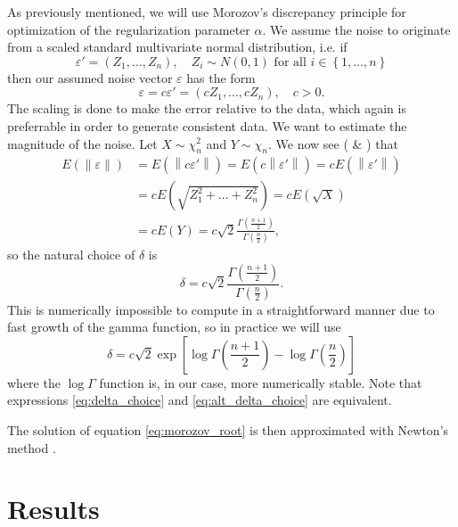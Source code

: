 \documentclass[12pt,a4]{article}
\newcommand{\lnorm}{\left\|}
\newcommand{\rnorm}{\right\|}
\newcommand{\eps}{\ensuremath{\varepsilon}}
\begin{document}
As previously mentioned, we will use Morozov's discrepancy principle for optimization of the regularization parameter $\alpha$. We assume the noise to originate from a scaled standard multivariate normal distribution, i.e. if
\begin{equation}
\eps' = \left(Z_1, \ldots, Z_n \right), \quad Z_i \sim N(0,1) \text{ for all }
i \in \left\{1, \ldots, n\right\}
\end{equation}
then our assumed noise vector $\eps$ has the form
\begin{equation}
\eps = c\eps' = \left(cZ_1, \ldots, cZ_n \right), \quad c > 0.
\end{equation}
The scaling is done to make the error relative to the data, which again is preferrable in order to generate consistent data. We want to estimate the magnitude of the noise. Let $X \sim \chi_n^2$ and $Y \sim \chi_n$. We now see (\cite{chi} \& \cite{handbook}) that
\begin{align*}
E\left(\lnorm \eps \rnorm \right)   &= E\left(\lnorm c\eps' \rnorm \right)   =
E\left(c \lnorm \eps' \rnorm \right) = c E\left(\lnorm \eps' \rnorm \right) \\
&= c E\left(\sqrt{Z_1^2 + \ldots + Z_n^2} \right) = c E\left(\sqrt{X} \right) \\
&= c E\left( Y \right) = 
c \sqrt{2}\frac{\Gamma\left(\frac{n+1}{2}\right)}{\Gamma\left(\frac{n}{2}\right)},  
\end{align*}
so the natural choice of $\delta$ is
\begin{equation}\label{eq:delta_choice}
\delta = c \sqrt{2}\frac{\Gamma\left(\frac{n+1}{2}\right)}{\Gamma\left(\frac{n}{2}\right)}.
\end{equation}
This is numerically impossible to compute in a straightforward manner due to fast growth of the gamma function, so in practice we will use 
\begin{equation}\label{eq:alt_delta_choice}
\delta = c\sqrt{2} \exp\left[
\log\Gamma\left(\frac{n+1}{2}\right) -  \log\Gamma\left(\frac{n}{2}\right) \right]  
\end{equation}
where the $\log\Gamma$ function is, in our case, more numerically stable. Note that expressions \eqref{eq:delta_choice} and \eqref{eq:alt_delta_choice} are equivalent.
 
The solution of equation \eqref{eq:morozov_root} is then approximated with Newton's method \cite{NR}.



\section{Results}\label{sec:results}
\end{document}
